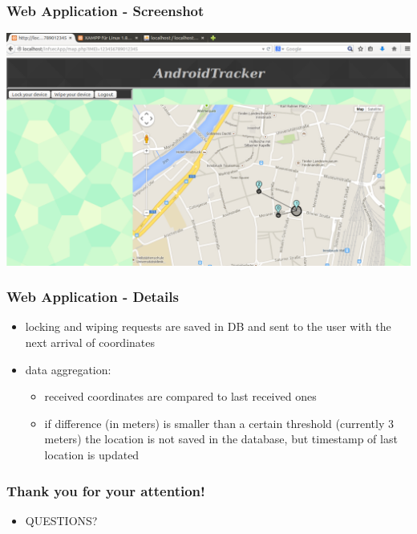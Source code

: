 \documentclass[darktitle]{beamer}
\begin{document}
	\begin{frame}
		\frametitle{Web Application - Screenshot}
		\begin{center}
		\includegraphics[height=0.75\textheight]{figures/webApp_map.pdf}
		\end{center}
	\end{frame}

	\begin{frame}
		\frametitle{Web Application - Details}
		\begin{itemize}
			\item locking and wiping requests are saved in DB and sent to the user with the next arrival of coordinates
			\item data aggregation:
			\begin{itemize}
			\item received coordinates are compared to last received ones
			\item if difference (in meters) is smaller than a certain threshold (currently 3 meters) the location is not saved in the database, but timestamp of last location is updated
			\end{itemize}
		\end{itemize}
	\end{frame}


	\begin{frame}
		\frametitle{Thank you for your attention!}
		\begin{itemize}
			\item[] \huge{QUESTIONS?}
		\end{itemize}
	\end{frame}

	
\end{document}

